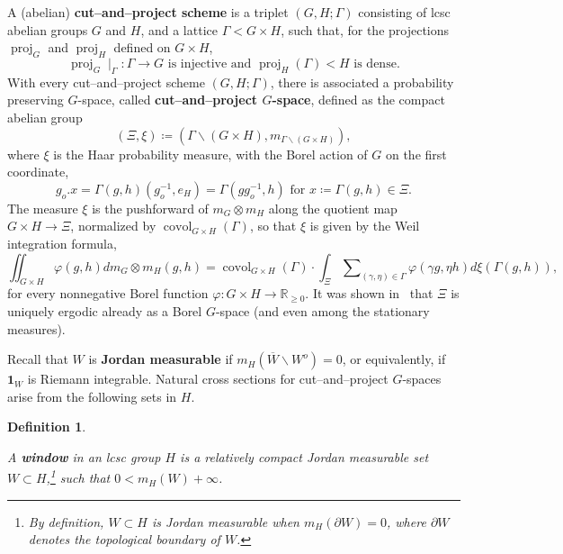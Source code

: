 \documentclass{amsart}
\numberwithin{equation}{subsection}
\newtheorem{defn}[thm]{Definition}
\theoremstyle{remark}
\begin{document}
A (abelian) {\bf cut--and--project scheme} is a triplet \(\left(G,H;\Gamma\right)\) consisting of lcsc abelian groups \(G\) and \(H\), and a lattice \(\Gamma<G\times H\), such that, for the projections \(\operatorname{proj}_{G}\) and \(\operatorname{proj}_{H}\) defined on \(G\times H\),
\[\operatorname{proj}_{G}\mid_{\Gamma}:\Gamma\longrightarrow G\text{ is injective and }\operatorname{proj}_{H}\left(\Gamma\right)<H\text{ is dense.}\]
With every cut--and--project scheme \(\left(G,H;\Gamma\right)\), there is associated a probability preserving \(G\)-space, called {\bf cut--and--project \(G\)-space}, defined as the compact abelian group
\[\left(\Xi,\xi\right)\coloneqq\left(\Gamma\backslash\left(G\times H\right),m_{\Gamma\backslash\left(G\times H\right)}\right),\]
where \(\xi\) is the Haar probability measure, with the Borel action of \(G\) on the first coordinate,
\[g_{o}.x=\Gamma\left(g,h\right)\left(g_{o}^{-1},e_{H}\right)=\Gamma\left(gg_{o}^{-1},h\right)\text{ for }x\coloneqq \Gamma\left(g,h\right)\in\Xi.\]
The measure \(\xi\) is the pushforward of \(m_{G}\otimes m_{H}\) along the quotient map \(G\times H\to\Xi\), normalized by \(\operatorname{covol}_{G\times H}\left(\Gamma\right)\), so that \(\xi\) is given by the Weil integration formula,
\begin{equation}\label{eq:xiformula}
\iint\nolimits_{G\times H}\varphi\left(g,h\right)dm_{G}\otimes m_{H}\left(g,h\right)=\operatorname{covol}_{G\times H}\left(\Gamma\right)\cdot\int_{\Xi}\sum\nolimits_{\left(\gamma,\eta\right)\in\Gamma}\varphi\left(\gamma g,\eta h\right)d\xi\left(\Gamma\left(g,h\right)\right),
\end{equation}
for every nonnegative Borel function \(\varphi:G\times H\to\mathbb{R}_{\geq 0}\). It was shown in~\cite[\S3.2]{BjHaPoI} that \(\Xi\) is uniquely ergodic already as a Borel \(G\)-space (and even among the stationary measures).

Recall that \(W\) is {\bf Jordan measurable} if \(m_{H}\left(\overline{W}\backslash W^{o}\right)=0\), or equivalently, if \(\mathbf{1}_{W}\) is Riemann integrable. Natural cross sections for cut--and--project \(G\)-spaces arise from the following sets in \(H\).

\begin{defn}\hypertarget{window}{}
A {\bf window} in an lcsc group \(H\) is a relatively compact Jordan measurable set \(W\subset H\),\footnote{By definition, \(W\subset H\) is Jordan measurable when \(m_{H}\left(\partial{W}\right)=0\), where \(\partial{W}\) denotes the topological boundary of \(W\).} such that \(0<m_{H}\left(W\right)+\infty\).
\end{defn}
\end{document}
